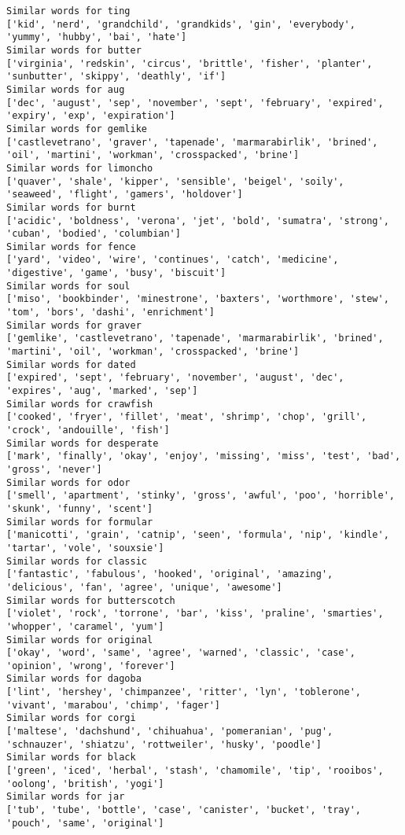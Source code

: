 \documentclass[11pt]{article}
\begin{document}
\begin{Verbatim}[commandchars=\\\{\}]
Similar words for ting
['kid', 'nerd', 'grandchild', 'grandkids', 'gin', 'everybody', 'yummy', 'hubby', 'bai', 'hate']
Similar words for butter
['virginia', 'redskin', 'circus', 'brittle', 'fisher', 'planter', 'sunbutter', 'skippy', 'deathly', 'if']
Similar words for aug
['dec', 'august', 'sep', 'november', 'sept', 'february', 'expired', 'expiry', 'exp', 'expiration']
Similar words for gemlike
['castlevetrano', 'graver', 'tapenade', 'marmarabirlik', 'brined', 'oil', 'martini', 'workman', 'crosspacked', 'brine']
Similar words for limoncho
['quaver', 'shale', 'kipper', 'sensible', 'beigel', 'soily', 'seaweed', 'flight', 'gamers', 'holdover']
Similar words for burnt
['acidic', 'boldness', 'verona', 'jet', 'bold', 'sumatra', 'strong', 'cuban', 'bodied', 'columbian']
Similar words for fence
['yard', 'video', 'wire', 'continues', 'catch', 'medicine', 'digestive', 'game', 'busy', 'biscuit']
Similar words for soul
['miso', 'bookbinder', 'minestrone', 'baxters', 'worthmore', 'stew', 'tom', 'bors', 'dashi', 'enrichment']
Similar words for graver
['gemlike', 'castlevetrano', 'tapenade', 'marmarabirlik', 'brined', 'martini', 'oil', 'workman', 'crosspacked', 'brine']
Similar words for dated
['expired', 'sept', 'february', 'november', 'august', 'dec', 'expires', 'aug', 'marked', 'sep']
Similar words for crawfish
['cooked', 'fryer', 'fillet', 'meat', 'shrimp', 'chop', 'grill', 'crock', 'andouille', 'fish']
Similar words for desperate
['mark', 'finally', 'okay', 'enjoy', 'missing', 'miss', 'test', 'bad', 'gross', 'never']
Similar words for odor
['smell', 'apartment', 'stinky', 'gross', 'awful', 'poo', 'horrible', 'skunk', 'funny', 'scent']
Similar words for formular
['manicotti', 'grain', 'catnip', 'seen', 'formula', 'nip', 'kindle', 'tartar', 'vole', 'souxsie']
Similar words for classic
['fantastic', 'fabulous', 'hooked', 'original', 'amazing', 'delicious', 'fan', 'agree', 'unique', 'awesome']
Similar words for butterscotch
['violet', 'rock', 'torrone', 'bar', 'kiss', 'praline', 'smarties', 'whopper', 'caramel', 'yum']
Similar words for original
['okay', 'word', 'same', 'agree', 'warned', 'classic', 'case', 'opinion', 'wrong', 'forever']
Similar words for dagoba
['lint', 'hershey', 'chimpanzee', 'ritter', 'lyn', 'toblerone', 'vivant', 'marabou', 'chimp', 'fager']
Similar words for corgi
['maltese', 'dachshund', 'chihuahua', 'pomeranian', 'pug', 'schnauzer', 'shiatzu', 'rottweiler', 'husky', 'poodle']
Similar words for black
['green', 'iced', 'herbal', 'stash', 'chamomile', 'tip', 'rooibos', 'oolong', 'british', 'yogi']
Similar words for jar
['tub', 'tube', 'bottle', 'case', 'canister', 'bucket', 'tray', 'pouch', 'same', 'original']

\end{Verbatim}
\end{document}
